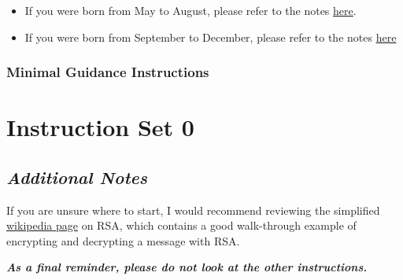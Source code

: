 {\begin{itemize}
                        \item If you were born from May to August, please refer to the notes \href{https://github.com/brendonky18/Honors-Thesis.CTFs/blob/main/crypto-cracking/notes_1.md}{here}.



                        \item If you were born from September to December, please refer to the notes \href{https://github.com/brendonky18/Honors-Thesis.CTFs/blob/main/crypto-cracking/notes_1.md}{here}



                    \end{itemize}



            }



        \newpage



        \subsubsection{Minimal Guidance Instructions}



            {\parindent0pt\singlespacing



                \section*{Instruction Set 0}



                    \subsection*{\textit{Additional Notes}}



                        If you are unsure where to start, I would recommend reviewing the simplified \href{https://simple.wikipedia.org/wiki/RSA_algorithm}{wikipedia page} on RSA, which contains a good walk-through example of encrypting and decrypting a message with RSA.







                    \textbf{\textit{As a final reminder, please do not look at the other instructions.}}



            }



